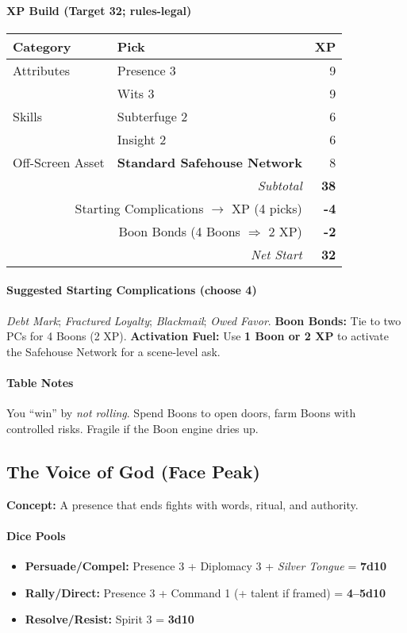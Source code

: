 \documentclass[11pt]{article}
\begin{document}
\paragraph{XP Build (Target 32; rules-legal)}
\begin{tabular}{@{}llr@{}}
\toprule
\textbf{Category} & \textbf{Pick} & \textbf{XP} \\
\midrule
Attributes & Presence 3 & 9 \\
           & Wits 3 & 9 \\
Skills     & Subterfuge 2 & 6 \\
           & Insight 2 & 6 \\
Off-Screen Asset & \textbf{Standard Safehouse Network} & 8 \\
\midrule
\multicolumn{2}{r}{\textit{Subtotal}} & \textbf{38} \\
\multicolumn{2}{r}{Starting Complications $\rightarrow$ XP (4 picks)} & \textbf{-4} \\
\multicolumn{2}{r}{Boon Bonds (4 Boons $\Rightarrow$ 2 XP)} & \textbf{-2} \\
\midrule
\multicolumn{2}{r}{\textit{Net Start}} & \textbf{32} \\
\bottomrule
\end{tabular}

\paragraph{Suggested Starting Complications (choose 4)}
\emph{Debt Mark}; \emph{Fractured Loyalty}; \emph{Blackmail}; \emph{Owed Favor}.  
\textbf{Boon Bonds:} Tie to two PCs for 4 Boons (2 XP).  
\textbf{Activation Fuel:} Use \textbf{1 Boon or 2 XP} to activate the Safehouse Network for a scene-level ask.

\paragraph{Table Notes}
You “win” by \emph{not rolling}. Spend Boons to open doors, farm Boons with controlled risks. Fragile if the Boon engine dries up.

\bigskip

\subsection*{The Voice of God (Face Peak)}
\textbf{Concept:} A presence that ends fights with words, ritual, and authority.

\paragraph{Dice Pools}
\begin{itemize}
  \item \textbf{Persuade/Compel:} Presence 3 + Diplomacy 3 + \emph{Silver Tongue} = \textbf{7d10}
  \item \textbf{Rally/Direct:} Presence 3 + Command 1 (+ talent if framed) = \textbf{4–5d10}
  \item \textbf{Resolve/Resist:} Spirit 3 = \textbf{3d10}
\end{itemize}
\end{document}
